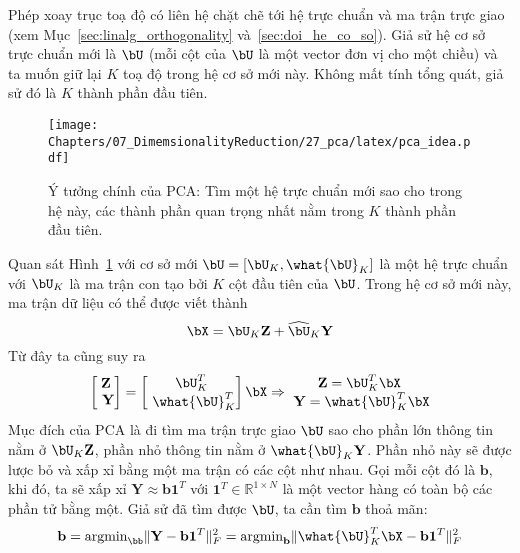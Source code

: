 Phép xoay trục toạ độ có liên hệ chặt chẽ tới hệ trực chuẩn và ma trận trực giao
(xem Mục~\ref{sec:linalg_orthogonality} và~\ref{sec:doi_he_co_so}). Giả sử hệ cơ
sở trực chuẩn mới là $\bU$ (mỗi cột của $\bU$ là một vector đơn vị cho
một chiều) và ta muốn giữ lại $K$ toạ độ trong hệ
cơ sở mới này. Không mất tính tổng quát, giả sử đó là $K$ thành phần đầu tiên.
\begin{figure}[t]
\centering
    \texttt{[image: Chapters/07\_DimemsionalityReduction/27\_pca/latex/pca\_idea.pdf]}
    \caption[]{Ý tưởng chính của PCA: Tìm một hệ trực chuẩn mới sao cho trong hệ này, các thành phần quan trọng nhất nằm trong $K$ thành phần đầu tiên.}
    \label{fig:27_3}
\end{figure}
Quan sát Hình~\ref{fig:27_3} với cơ sở mới $\bU =
[\bU_K, \what{\bU}_K]$ là một hệ trực chuẩn với $\bU_K$ là ma trận con tạo bởi $K$ cột đầu tiên của $\bU$. Trong hệ cơ sở mới này, ma trận dữ liệu có thể được viết thành
\begin{equation} 
\label{eqn:27_8}
    \bX = \bU_K \mathbf{Z} + \widehat{\bU}_K \mathbf{Y}
\end{equation} 
Từ đây ta cũng suy ra
\begin{eqnarray} 
\label{eqn:27_9}
    \left[\begin{matrix} \mathbf{Z} \\\ \mathbf{Y} \end{matrix} \right] =  
    \left[\begin{matrix} \bU_K^T \\\ \what{\bU}_K^T \end{matrix} \right]\bX \Rightarrow 
    \begin{matrix} 
    \mathbf{Z} = \bU_K^T \bX \\\ 
    \mathbf{Y} = \what{\bU}_K^T\bX 
    \end{matrix} 
\end{eqnarray}
Mục đích của PCA là đi tìm ma trận trực giao $\bU$ sao cho phần lớn thông tin
nằm ở $\bU_K \mathbf{Z}$, phần nhỏ thông tin nằm ở $\what{\bU}_K\mathbf{Y}$.
Phần nhỏ này sẽ được lược bỏ và xấp xỉ bằng một ma trận có các
cột như nhau. Gọi mỗi cột đó là
$\mathbf{b}$, khi đó, ta sẽ xấp xỉ $\mathbf{Y} \approx
\mathbf{b1}^T$ với $\mathbf{1}^T\in \mathbb{R}^{1
\times N}$ là một vector hàng có toàn
bộ các phần tử bằng một. Giả sử đã tìm được $\bU$, ta cần tìm $\mathbf{b}$ thoả mãn:
\begin{equation} 
    \mathbf{b} = \text{argmin}_{\bb} \|\mathbf{Y} - \mathbf{b1}^T\|_F^2 =
    \text{argmin}_{\mathbf{b}} \|\what{\bU}_K^T\bX - \mathbf{b1}^T\|_F^2 
\end{equation} 
